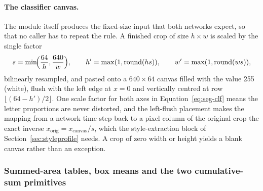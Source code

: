 \paragraph{The classifier canvas.}
The module itself produces the fixed-size input that both networks expect, so that no caller has to repeat the rule.
A finished crop of size $h\times w$ is scaled by the single factor
\begin{equation}
s=\min\!\Bigl(\frac{64}{h},\frac{640}{w}\Bigr),\qquad h'=\max(1,\mathrm{round}(hs)),\qquad w'=\max(1,\mathrm{round}(ws)),
\label{eq:seg-clf}
\end{equation}
bilinearly resampled, and pasted onto a $640\times64$ canvas filled with the value 255 (white), flush with the left edge at $x=0$ and vertically centred at row $\lfloor(64-h')/2\rfloor$.
One scale factor for both axes in Equation~\ref{eq:seg-clf} means the letter proportions are never distorted, and the left-flush placement makes the mapping from a network time step back to a pixel column of the original crop the exact inverse $x_{\mathrm{orig}}=x_{\mathrm{canvas}}/s$, which the style-extraction block of Section~\ref{sec:styleprofile} needs.
A crop of zero width or height yields a blank canvas rather than an exception.

\subsubsection{Summed-area tables, box means and the two cumulative-sum primitives}

